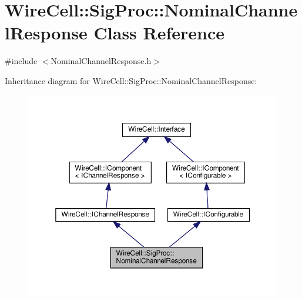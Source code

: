 \hypertarget{class_wire_cell_1_1_sig_proc_1_1_nominal_channel_response}{}\section{Wire\+Cell\+:\+:Sig\+Proc\+:\+:Nominal\+Channel\+Response Class Reference}
\label{class_wire_cell_1_1_sig_proc_1_1_nominal_channel_response}


{\ttfamily \#include $<$Nominal\+Channel\+Response.\+h$>$}



Inheritance diagram for Wire\+Cell\+:\+:Sig\+Proc\+:\+:Nominal\+Channel\+Response\+:
\nopagebreak
\begin{figure}[H]
\begin{center}
\leavevmode
\includegraphics[width=350pt]{class_wire_cell_1_1_sig_proc_1_1_nominal_channel_response__inherit__graph}
\end{center}
\end{figure}


